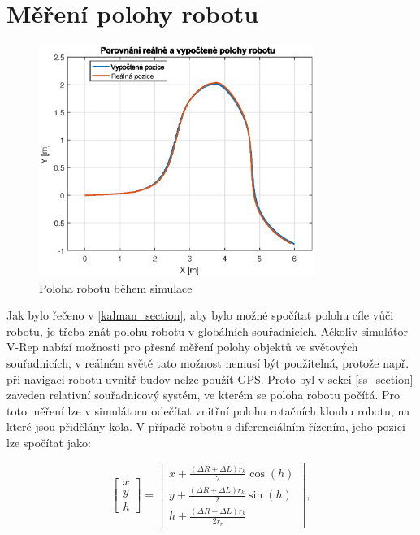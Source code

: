 \documentclass[twoside]{ctuthesis}
\theoremstyle{plain}
\theoremstyle{definition}
\theoremstyle{note}
\begin{document}
\section{Měření polohy robotu}

\begin{figure}
	\caption{Poloha robotu během simulace}

	\label{rob_pos}
	\includegraphics[width=0.8\textwidth]{images/5/pos_rob.eps}
\end{figure}

Jak bylo řečeno v \ref{kalman_section}, aby bylo možné spočítat polohu cíle vůči robotu, je třeba znát polohu robotu v globálních souřadnicích. Ačkoliv simulátor V-Rep nabízí možnosti pro přesné měření polohy objektů ve světových souřadnicích, v reálném světě tato možnost nemusí být použitelná, protože např. při navigaci robotu uvnitř budov nelze použít GPS. Proto byl v sekci \ref{ss_section} zaveden relativní souřadnicový systém, ve kterém se poloha robotu počítá. Pro toto měření lze v simulátoru odečítat vnitřní polohu rotačních kloubu robotu, na které jsou přidělány kola. V případě robotu s diferenciálním řízením, jeho pozici lze spočítat jako:

\begin{equation}
\begin{bmatrix}
x\\
y\\
h
\end{bmatrix} =
\begin{bmatrix}
x + \frac{(\Delta R + \Delta L)r_{k}}{2}\cos(h)\\
y + \frac{(\Delta R + \Delta L)r_{k}}{2}\sin(h)\\
h + \frac{(\Delta R - \Delta L)r_k}{2r_r}
\end{bmatrix},
\end{equation}
\end{document}
